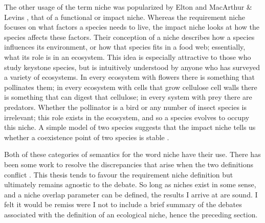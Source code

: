 The other usage of the term niche was popularized by Elton \cite{Elton1927} and MacArthur \& Levins \cite{MacArthur1967}, that of a functional or impact niche. 
Whereas the requirement niche focuses on what factors a species needs to live, the impact niche looks at how the species affects these factors. 
Their conception of a niche describes how a species influences its environment, or how that species fits in a food web; essentially, what its role is in an ecosystem. 
This idea is especially attractive to those who study keystone species, but is intuitively understood by anyone who has surveyed a variety of ecosystems. 
In every ecosystem with flowers there is something that pollinates them; in every ecosystem with cells that grow cellulose cell walls there is something that can digest that cellulose; in every system with prey there are predators. %
Whether the pollinator is a bird or any number of insect species is irrelevant; this role exists in the ecosystem, and so a species evolves to occupy this niche. 
A simple model of two species suggests that the impact niche tells us whether a coexistence point of two species is stable \cite{checkit}. 

Both of these categories of semantics for the word niche have their use. 
There has been some work to resolve the discrepancies that arise when the two definitions conflict \cite{Leibold1995,Leibold2006}. 
This thesis tends to favour the requirement niche definition but ultimately remains agnostic to the debate. 
So long as niches exist in some sense, and a niche overlap parameter can be defined, the results I arrive at are sound. 
I felt it would be remiss were I not to include a brief summary of the debates associated with the definition of an ecological niche, hence the preceding section. 



